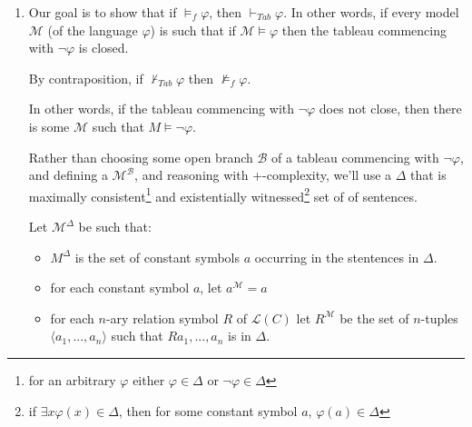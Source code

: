\documentclass[a4paper]{article}
\newcommand{\MODEL}{\mathcal{M}}
\newcommand{\LANGUAGE}{\mathcal{L}}
\newcommand{\TUPLE}[1]{\langle {#1} \rangle}
\newcommand{\SET}[1]{\{ {#1} \}}
\begin{document}
\begin{enumerate}
    where $E!c$ expands to $\exists x (x = c)$\footnote{I had to do this because the forest package wouldn't typeset leaves over a certain number of characters}.

    By new we mean that the name $a$ has not occured anywhere on the branches above.

    \item

Our goal is to show that if $\models_{f} \varphi$, then $\vdash_{Tab} \varphi$. In other words, if every model $\MODEL$ (of the language $\varphi$) is such that if $\MODEL \models \varphi$ then the tableau commencing with $\neg \varphi$ is closed.



By contraposition, if $\not\vdash_{Tab} \varphi$ then $ \not\models_{f} \varphi$.

In other words, if the tableau commencing with $\neg \varphi$ does not close, then there is some $\MODEL$ such that $M \models \neg \varphi$.


Rather than choosing some open branch $\mathcal{B}$ of a tableau commencing with $\neg \varphi$, and defining a $\MODEL^{\mathcal{B}}$, and reasoning with +-complexity, we'll use a $\Delta$ that is maximally consistent\footnote{for an arbitrary $\varphi$ either $\varphi \in \Delta$ or $\neg \varphi \in \Delta$} and existentially witnessed\footnote{if $\exists x \varphi(x) \in \Delta$, then for some constant symbol $a$, $\varphi(a) \in \Delta$} set of of sentences. 

Let $\MODEL^{\Delta}$ be such that:

\begin{itemize}
    \item $M^{\Delta}$ is the set of constant symbols $a$ occurring in the stentences in $\Delta$.
    \item for each constant symbol $a$, let $a^{\MODEL} = a$
    \item for each $n$-ary relation symbol $R$ of $\LANGUAGE(C)$ let $R^{\MODEL}$ be the set of $n$-tuples $\TUPLE{a_1, ..., a_n}$ such that $Ra_1,...,a_n$ is in $\Delta$.
\end{itemize}


\end{enumerate}
\end{document}
